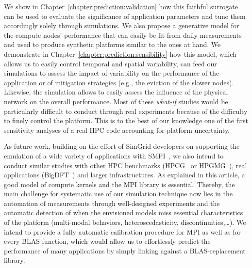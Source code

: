     We show in Chapter~\ref{chapter:prediction:validation} how this faithful surrogate can be used to evaluate the
    significance of application parameters and tune them accordingly solely through simulations.  We also propose a
    generative model for the compute nodes' performance that can easily be fit from daily measurements and used to
    produce synthetic platforms similar to the ones at hand. We demonstrate in
    Chapter~\ref{chapter:prediction:sensibility} how this model, which allows us to easily control temporal and spatial
    variability, can feed our simulations to assess the impact of variability on the performance of the application or
    of mitigation strategies (e.g., the eviction of the slower nodes). Likewise, the simulation allows to easily assess
    the influence of the physical network on the overall performance. Most of these \emph{what-if} studies would be
    particularly difficult to conduct through real experiments because of the difficulty to finely control the platform.
    This is to the best of our knowledge one of the first sensitivity analyses of a real HPC code accounting for
    platform uncertainty.

    As future work, building on the effort of SimGrid developers on supporting the emulation of a wide variety of
    applications with SMPI~\cite{smpi_proxy_apps}, we also intend to conduct similar studies with other HPC benchmarks
    (\eg HPCG~\cite{HPCG} or HPGMG~\cite{HPGMG}), real applications (\eg BigDFT~\cite{bigdft}) and larger infrastructures.
    As explained in this article, a good model of compute kernels and the MPI library is essential. Thereby, the main
    challenge for systematic use of our simulation technique now lies in the automation of measurements through
    well-designed experiments and the automatic detection of when the envisioned models miss essential characteristics
    of the platform (multi-modal behaviors, heteroscedasticity, discontinuities,\dots{}). We intend to provide a fully
    automatic calibration procedure for MPI as well as for every BLAS function, which would allow us to effortlessly
    predict the performance of many applications by simply linking against a BLAS-replacement library.
